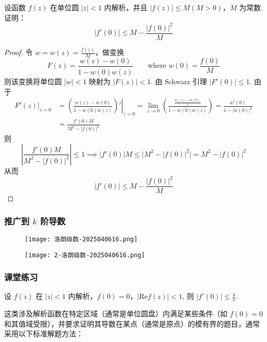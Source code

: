 \begin{exercise}
设函数 $f(z)$ 在单位圆 $\lvert z \rvert<1$ 内解析，并且 $\lvert f(z) \rvert\leq M(M>0)$，$M$ 为常数. 证明：
\[
\lvert f'(0) \rvert \leq M-\frac{\lvert f(0) \rvert ^2}{M}
\]
\end{exercise}
\begin{proof}
令 $w=w(z)=\frac{f(z)}{M}$，做变换
\[
F(z)=\frac{w(z)-w(0)}{1-\overline{w(0)}w(z)}\qquad \text{where }w(0)=\frac{f(0)}{M}
\]
则该变换将单位圆 $\lvert w \rvert<1$ 映射为 $\lvert F(z) \rvert<1$. 由 Schwarz 引理 $\lvert F'(0) \rvert\leq1$. 由于
\[
\begin{aligned}
\left.F'(z)\right|_{z=0} & =\left.\left( \frac{w(z)-w(0)}{1-\overline{w(0)}w(z)} \right)'\right|_{z=0}=\lim_{ z \to 0 } \left( \frac{\frac{w(z)-w(0)}{z}}{1-\overline{w(0)}w(z)} \right)=\frac{w'(0)}{1-\lvert w(0) \rvert ^2} \\
 & =\frac{f'(0)M}{M^2-\lvert f(0) \rvert ^2} 
\end{aligned}
\]
则
\[
\left\lvert  \frac{f'(0)M}{M^2-\lvert f(0) \rvert ^2}  \right\rvert \leq 1\implies \lvert f'(0) \rvert M\leq \lvert M^2-\lvert f(0) \rvert ^2 \rvert=M^2-\lvert f(0) \rvert ^2
\]
从而
\[
\lvert f'(0) \rvert \leq M-\frac{\lvert f(0) \rvert ^2}{M}
\]
\end{proof}

\subsubsection{推广到 \texorpdfstring{$k$}{k} 阶导数}

\begin{figure}[H]
\centering
\texttt{[image: 洛朗级数-2025040616.png]}
\label{}
\end{figure}

\begin{figure}[H]
\centering
\texttt{[image: 2-洛朗级数-2025040616.png]}
\label{}
\end{figure}

\subsubsection{课堂练习}

\begin{exercise}
设 $f(z)$ 在 $\lvert z \rvert<1$ 内解析，$f(0)=0$，$\lvert \mathrm{Re}f(z) \rvert<1$, 则 $\lvert f'(0) \rvert\leq\frac{4}{\pi}$.
\end{exercise}
这类涉及解析函数在特定区域（通常是单位圆盘）内满足某些条件（如 $f(0)=0$ 和其值域受限），并要求证明其导数在某点（通常是原点）的模有界的题目，通常采用以下标准解题方法：


